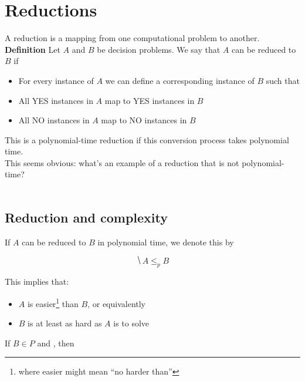 \documentclass[11  pt]{article}
\begin{document}
\section{Reductions}
A reduction is a mapping from one computational problem to another.  \\ 

\textbf{Definition} Let $A$ and $B$ be decision problems. We say that $A$ can be reduced to $B$ if

\begin{itemize}
	\item For every instance of $A$ we can define a corresponding instance of $B$ such that
	\item All YES instances in $A$ map to YES instances in $B$
	\item All NO instances in $A$ map to NO instances in $B$
\end{itemize}

\vfill

This is a polynomial-time reduction if this conversion process takes polynomial time. \\

This seems obvious: what's an example of a reduction that is not polynomial-time? \\ \\

\vfill

\newpage
\subsection{Reduction and complexity}

If $A$ can be reduced to $B$ in polynomial time, we denote this by 

\begin{equation*}
	\hide{A \leq_p B}
\end{equation*}

This implies that:
\begin{itemize}
	\item $A$ is easier\footnote{where easier might mean ``no harder than''} than $B$, or equivalently 
	\item $B$ is at least as hard as $A$ is to solve\\
\end{itemize} 

\begin{lemma} 
	If $B \in P$ and , then 
\end{lemma}	
\end{document}
